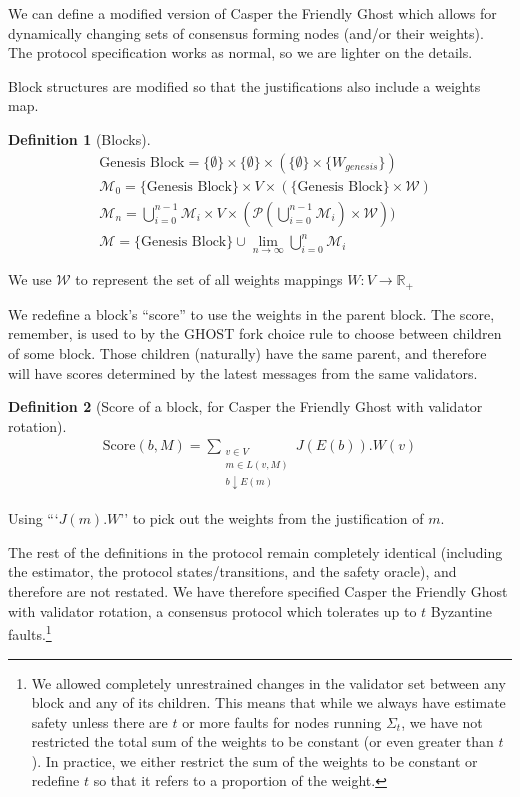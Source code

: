 \documentclass{article}
\theoremstyle{definition}
\newtheorem{defn}{Definition}[section]
\begin{document}
We can define a modified version of Casper the Friendly Ghost which allows for dynamically changing sets of consensus forming nodes (and/or their weights). The protocol specification works as normal, so we are lighter on the details.

Block structures are modified so that the justifications also include a weights map.

\begin{defn}[Blocks]
\begin{equation*}
\begin{split}
  &\text{Genesis Block} = \{\emptyset\} \times \{\emptyset\} \times (\{\emptyset\} \times \{W_{genesis}\})\\
    &\mathcal{M}_0 = \{\text{Genesis Block}\} \times V \times (\{\text{Genesis Block}\} \times \mathcal{W})\\
    &\mathcal{M}_n = \bigcup_{i=0}^{n-1} \mathcal{M}_i \times V \times (\mathcal{P}(\bigcup_{i=0}^{n-1} \mathcal{M}_i) \times \mathcal{W}))\\
    &\mathcal{M} = \{\text{Genesis Block}\} \cup \lim_{n \to \infty} \bigcup_{i=0}^{n} \mathcal{M}_i
\end{split}
\end{equation*}
\end{defn}

We use $\mathcal{W}$ to represent the set of all weights mappings $W:V \to \mathbb{R}_+$

We redefine a block's ``score'' to use the weights in the parent block. The score, remember, is used to by the GHOST fork choice rule to choose between children of some block. Those children (naturally) have the same parent, and therefore will have scores determined by the latest messages from the same validators.

\begin{defn}[Score of a block, for Casper the Friendly Ghost with validator rotation]
\begin{align}
\text{Score}(b, M) = \sum_{\substack{v \in V \\ m \in L(v,M) \\ b \downarrow E(m)}} J(E(b)).W(v)
\end{align}
\end{defn}

Using ```$J(m).W$'' to pick out the weights from the justification of $m$.

The rest of the definitions in the protocol remain completely identical (including the estimator, the protocol states/transitions, and the safety oracle), and therefore are not restated. We have therefore specified Casper the Friendly Ghost with validator rotation, a consensus protocol which tolerates up to $t$ Byzantine faults.\footnote{We allowed completely unrestrained changes in the validator set between any block and any of its children. This means that while we always have estimate safety unless there are $t$ or more faults for nodes running $\Sigma_t$, we have not restricted the total sum of the weights to be constant (or even greater than $t$). In practice, we either restrict the sum of the weights to be constant or redefine $t$ so that it refers to a proportion of the weight.}
\end{document}
